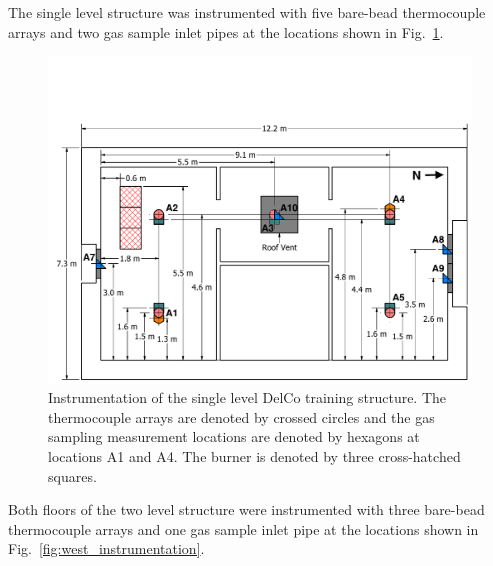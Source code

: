 The single level structure was instrumented with five bare-bead thermocouple arrays and two gas sample inlet pipes at the locations shown in Fig.~\ref{fig:east_instrumentation}.
\begin{figure}[!ht]
\includegraphics[width=\columnwidth]{FIGURES/DelCo_Trainers/East_Structure_Dimensioned_Instrumentation}
\caption[Instrumentation of the single level DelCo training structure]{Instrumentation of the single level DelCo training structure. The thermocouple arrays are denoted by crossed circles and the gas sampling measurement locations are denoted by hexagons at locations A1 and A4. The burner is denoted by three cross-hatched squares.}
\label{fig:east_instrumentation}
\end{figure}
Both floors of the two level structure were instrumented with three bare-bead thermocouple arrays and one gas sample inlet pipe at the locations shown in Fig.~\ref{fig:west_instrumentation}.
